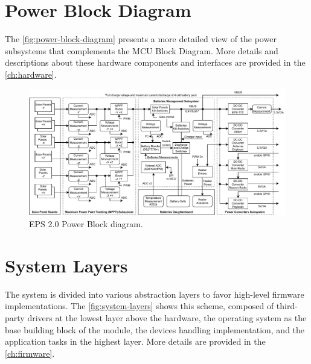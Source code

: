 \section{Power Block Diagram}

The \autoref{fig:power-block-diagram} presents a more detailed view of the power subsystems that complements the MCU Block Diagram. More details and descriptions about these hardware components and interfaces are provided in the \autoref{ch:hardware}.

\begin{figure}[!ht]
    \begin{center}
        \includegraphics[width=\textwidth]{figures/eps2_power_diagram.pdf}
        \caption{EPS 2.0 Power Block diagram.}
        \label{fig:power-block-diagram}
    \end{center}
\end{figure}

\section{System Layers} \label{sec:system-layers}

The system is divided into various abstraction layers to favor high-level firmware implementations. The \autoref{fig:system-layers} shows this scheme, composed of third-party drivers at the lowest layer above the hardware, the operating system as the base building block of the module, the devices handling implementation, and the application tasks in the highest layer. More details are provided in the \autoref{ch:firmware}.

